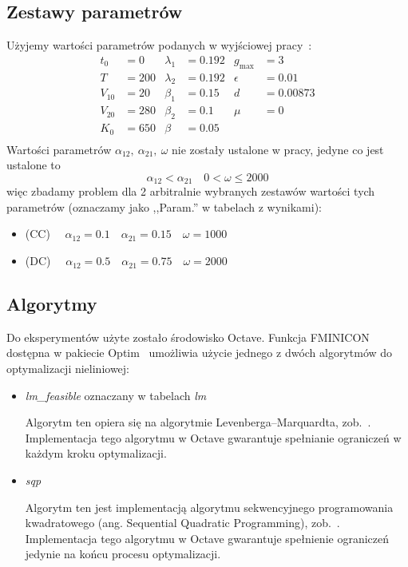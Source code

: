 \documentclass[licencjacka]{pracamgr}
\begin{document}
\subsection{Zestawy parametrów}
Użyjemy wartości parametrów podanych w wyjściowej pracy~\cite{BBF-manuscript}:
\begin{align*}
  t_0 &= 0          & \lambda_1 &= 0.192 & g_{\max} &= 3    \\
  T &= 200          & \lambda_2 &= 0.192 & \epsilon &= 0.01 \\
  V_{10} &= 20      & \beta_1 &= 0.15    & d &= 0.00873     \\
  V_{20} &= 280     & \beta_2 &= 0.1     & \mu &= 0         \\
  K_0 &= 650        & \beta &= 0.05      &       &          \\
\end{align*}
Wartości parametrów $\alpha_{12},\ \alpha_{21},\ \omega$ nie zostały ustalone w pracy, jedyne co jest ustalone to
\[ \alpha_{12} < \alpha_{21}\quad 0 < \omega \le 2000 \]
więc zbadamy problem dla 2 arbitralnie wybranych zestawów wartości tych parametrów (oznaczamy jako ,,Param.'' w tabelach z wynikami):
\begin{itemize}
\item{(CC)} $\quad \alpha_{12} = 0.1 \quad \alpha_{21} = 0.15 \quad \omega = 1000$
\item{(DC)} $\quad \alpha_{12} = 0.5 \quad \alpha_{21} = 0.75 \quad \omega = 2000$ 
\end{itemize}
\subsection{Algorytmy}
Do eksperymentów użyte zostało środowisko Octave. Funkcja FMINICON dostępna w pakiecie Optim~\cite{optim} umożliwia użycie jednego z dwóch algorytmów do optymalizacji nieliniowej:
\begin{itemize}
\item{\it lm\_feasible\/} oznaczany w tabelach {\it lm\/}

  Algorytm ten opiera się na algorytmie Levenberga–Marquardta, zob.~\cite{Kelley}. Implementacja tego algorytmu w Octave gwarantuje spełnianie ograniczeń w każdym kroku optymalizacji.
  
\item{\it sqp\/}
  
  Algorytm ten jest implementacją algorytmu sekwencyjnego programowania kwadratowego (ang. Sequential Quadratic Programming), zob.~\cite{Boggs}. Implementacja tego algorytmu w Octave gwarantuje spełnienie ograniczeń jedynie na końcu procesu optymalizacji.  
\end{itemize}
\end{document}

